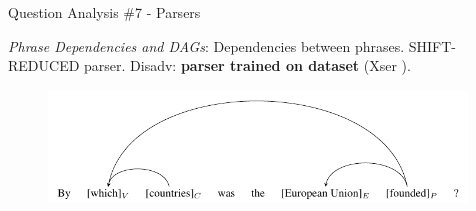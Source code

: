 \documentclass{beamer}
\begin{document}
\note{}

\begin{frame}{Question Analysis \#7 - Parsers}
  \begin{cardTiny}
    \textit{Phrase Dependencies and DAGs}: Dependencies between phrases. SHIFT-REDUCED parser. Disadv: \textbf{parser trained on dataset} (Xser \cite{xu2014a}).
    \begin{figure}\label{fig:standford_dag}
      \centering
      \includegraphics[width=0.99\textwidth]{./res/standford_dag.png}
    \end{figure}
  \end{cardTiny}
\end{frame}

\end{document}
